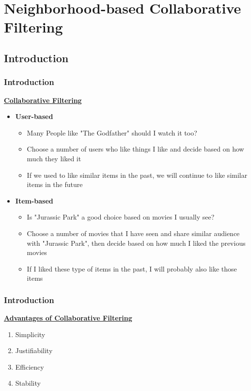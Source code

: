 
\section{Neighborhood-based Collaborative Filtering}
\subsection{Introduction}
\begin{frame}
    \frametitle{Introduction}
    \centering
    \underline{\textbf{Collaborative Filtering}}
    \begin{itemize}
        \item \textbf{User-based}
            \begin{itemize}
                \item Many People like "The Godfather" should I watch it too?
                \item Choose a number of users who like things I like and
                      decide based on how much they liked it
                \item If we used to like similar items in the past, we will continue to like similar items in the future
            \end{itemize}
        \item \textbf{Item-based}
            \begin{itemize}
                \item Is "Jurassic Park" a good choice based on movies I usually see?
                \item Choose a number of movies that I have seen and share similar audience with "Jurassic Park",
                then decide based on how much I liked the previous movies
                \item If I liked these type of items in the past, I will probably also like those items
            \end{itemize}
    \end{itemize}
\end{frame}
\begin{frame}[t]
    \frametitle{Introduction}
    \centering
    \underline{\textbf{Advantages of Collaborative Filtering}}
    \begin{center}
        \begin{enumerate}
            \item Simplicity
            \item Justifiability
            \item Efficiency
            \item Stability
        \end{enumerate}
    \end{center}
\end{frame}

